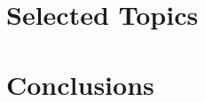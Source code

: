 \documentclass[12pt]{../include/ucthesis}
\begin{document}

















\chapter{Selected Topics}






\chapter{Conclusions}



% 
% 


\nocite{*}
% 

\singlespacing


\doublespacing
\end{document}

